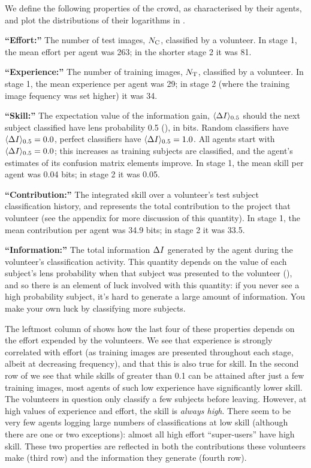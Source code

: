 \documentclass[useAMS,usenatbib,a4paper]{mn2e}
\begin{document}
We define the following properties of the crowd, as characterised by their
agents, and plot the distributions of their logarithms in
. 
%
\begin{description}
%
\item{\noindent\bf ``Effort:''} The number of test images, $N_{\rm C}$, classified by a
volunteer. In stage 1, the mean effort per agent was 263; in the shorter stage
2 it was 81.
%
\item{\noindent\bf ``Experience:''} The number of training images, $N_{\rm T}$,
classified by a volunteer. In stage 1, the mean experience per agent was 29;
in stage 2 (where the training image fequency was set higher) it was 34.
%
\item{\noindent\bf ``Skill:''} The expectation value of the information gain, 
${\langle \Delta I \rangle_{0.5}}$
should  the next subject classified have lens probability 0.5
(),  in bits. Random classifiers have ${\langle \Delta I \rangle_{0.5}} = 0.0$,
perfect classifiers have ${\langle \Delta I \rangle_{0.5}} = 1.0$. All agents start with ${\langle \Delta I \rangle_{0.5}} = 0.0$;
this increases as training subjects are classified, and the agent's estimates
of its confusion matrix elements improve. In stage 1, the mean skill per agent
was 0.04 bits; in  stage 2 it was 0.05.
%
\item{\noindent\bf ``Contribution:''} The integrated skill over a volunteer's test
subject classification history, and represents the total  contribution to the
project that volunteer (see the appendix for more discussion of this
quantity). In stage 1, the mean contribution per agent was 34.9 bits; in 
stage 2 it was 33.5.
%
\item{\noindent\bf ``Information:''} The total information $\Delta I$ generated by
the  agent during the volunteer's classification activity. This quantity
depends on the value of each subject's lens probability when that subject was 
presented to the volunteer (), and so there is an element
of luck involved with this quantity: if you never see a high probability
subject, it's hard to generate a large amount of information. You make your
own luck by classifying more subjects.
%
\end{description}

The leftmost column of  shows how the last four of
these properties depends on the effort expended by the volunteers. We see that
experience is strongly correlated with effort (as training images are
presented throughout each stage, albeit at decreasing frequency), and that
this is also true for skill. In the second row of 
we see that while skills of greater than 0.1 can be attained after just a few
training images, most agents of such low experience have significantly lower
skill. The volunteers in question only classify a few subjects before leaving.
However, at high values of experience and effort, the skill is \emph{always
high}. There seem to be very few agents logging large numbers of
classifications at low skill (although there are one or two exceptions): almost
all high effort ``super-users'' have high skill. These two properties are
reflected in both the contributions these volunteers make (third row) and the
information they generate (fourth row).
\end{document}
